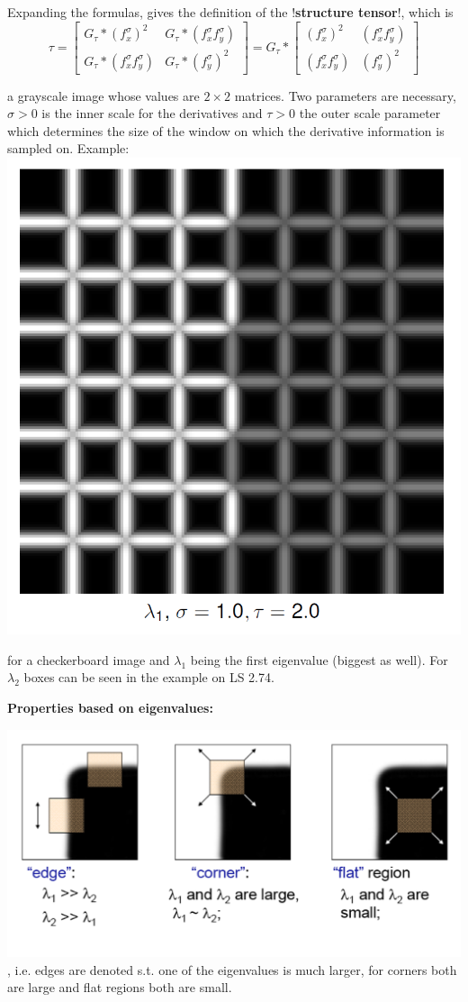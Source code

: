 Expanding the formulas, gives the definition of the !\textbf{structure tensor}!, which is
$$\tau = \left[
\begin{matrix}
G_\tau * (f_x^\sigma)^2 & G_\tau * (f_x^\sigma f_y^\sigma) \\
G_\tau * (f_x^\sigma f_y^\sigma) & G_\tau * (f_y^\sigma)^2
\end{matrix}\right] = G_\tau * \left[
\begin{matrix}
 (f_x^\sigma)^2 & (f_x^\sigma f_y^\sigma) \\
(f_x^\sigma f_y^\sigma) & (f_y^\sigma)^2
\end{matrix}\right]$$

a grayscale image whose values are $2\times 2$ matrices. Two parameters are necessary, $\sigma > 0$ is the inner scale for the derivatives and $\tau > 0$ the outer scale parameter which determines the size of the window on which the derivative information is sampled on. Example: \\
\includegraphics[width=.5\textwidth]{images/chap3/st_ex}

for a checkerboard image and $\lambda_1$ being the first eigenvalue (biggest as well). For $\lambda_2$ boxes can be seen in the example on LS 2.74.

\textbf{Properties based on eigenvalues:}

\includegraphics[width=.6\textwidth]{images/chap3/st_props}, i.e. edges are denoted s.t. one of the eigenvalues is much larger, for corners both are large and flat regions both are small. 

